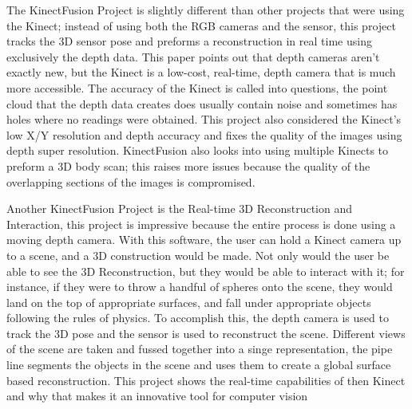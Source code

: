 \documentclass[pdftex,10.5pt]{report}
\begin{document}
The KinectFusion Project is slightly different than other projects that were using the Kinect; instead of using both the RGB cameras and the sensor, this project tracks the 3D sensor pose and preforms a reconstruction in real time using exclusively the depth data. This paper points out that depth cameras aren't exactly new, but the Kinect is a low-cost, real-time, depth camera that is much more accessible. The accuracy of the Kinect is called into questions, the point cloud that the depth data creates does usually contain noise and sometimes has holes where no readings were obtained. This project also considered the Kinect's low X/Y resolution and depth accuracy and fixes the quality of the images using depth super resolution. KinectFusion also looks into using multiple Kinects to preform a 3D body scan; this raises more issues because the quality of the overlapping sections of the images is compromised.

Another KinectFusion Project is the Real-time 3D Reconstruction and Interaction, this project is impressive because the entire process is done using a moving depth camera. With this software, the user can hold a Kinect camera up to a scene, and a 3D construction would be made. Not only would the user be able to see the 3D Reconstruction, but they would be able to interact with it; for instance, if they were to throw a handful of spheres onto the scene, they would land on the top of appropriate surfaces, and fall under appropriate objects following the rules of physics. To accomplish this, the depth camera is used to track the 3D pose and the sensor is used to reconstruct the scene. Different views of the scene are taken and fussed together into a singe representation, the pipe line segments the objects in the scene and uses them to create a global surface based reconstruction. This project shows the real-time capabilities of then Kinect and why that makes it an innovative tool for computer vision
\end{document}
